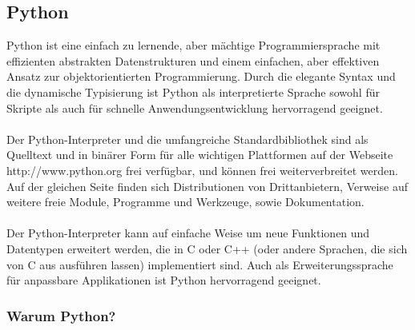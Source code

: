 \subsection{Python}
\noindent
Python ist eine einfach zu lernende, aber mächtige Programmiersprache mit effizienten abstrakten Datenstrukturen und einem einfachen, aber effektiven Ansatz zur objektorientierten Programmierung. Durch die elegante Syntax und die dynamische Typisierung ist Python als interpretierte Sprache sowohl für Skripte als auch für schnelle Anwendungsentwicklung hervorragend geeignet.\\
\\
Der Python-Interpreter und die umfangreiche Standardbibliothek sind als Quelltext und in binärer Form für alle wichtigen Plattformen auf der Webseite http://www.python.org frei verfügbar, und können frei weiterverbreitet werden. Auf der gleichen Seite finden sich Distributionen von Drittanbietern, Verweise auf weitere freie Module, Programme und Werkzeuge, sowie Dokumentation.\\
\\
Der Python-Interpreter kann auf einfache Weise um neue Funktionen und Datentypen erweitert werden, die in C oder C++ (oder andere Sprachen, die sich von C aus ausführen lassen) implementiert sind. Auch als Erweiterungssprache für anpassbare Applikationen ist Python hervorragend geeignet.

\subsubsection{Warum Python?}

